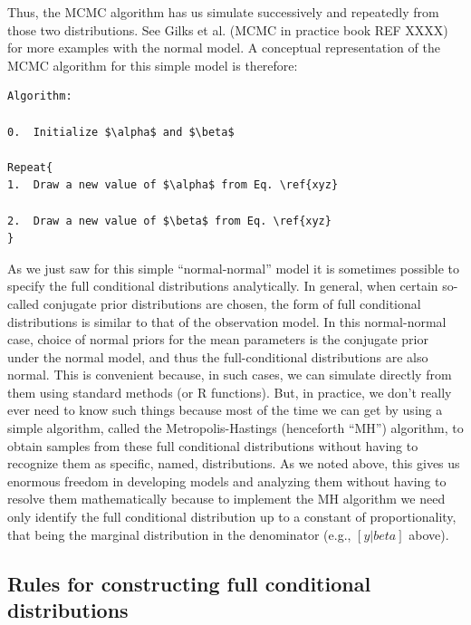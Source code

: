 Thus, the MCMC algorithm has us simulate successively and repeatedly from those two distributions. See Gilks et al. (MCMC in practice book REF XXXX) for more examples with the normal model. A conceptual representation of the MCMC algorithm for this simple model is therefore: 
\begin{verbatim}
Algorithm:

0.	Initialize $\alpha$ and $\beta$

Repeat{
1.	Draw a new value of $\alpha$ from Eq. \ref{xyz}

2.	Draw a new value of $\beta$ from Eq. \ref{xyz}
}
\end{verbatim}

As we just saw for this simple ``normal-normal'' model it is sometimes possible to specify the full conditional distributions analytically. In general, when certain so-called conjugate prior distributions are chosen, the form of full conditional distributions is similar to that of the observation model. In this normal-normal case, choice of normal priors for the mean parameters is the conjugate prior under the normal model, and thus the full-conditional distributions are also normal. This is convenient because, in such cases, we can simulate directly from them using standard methods (or R functions).  But, in practice,  we don't really ever need to know such things because most of the time we can get by using a simple algorithm, called the Metropolis-Hastings (henceforth ``MH'') algorithm, to obtain samples from these full conditional distributions without having to recognize them as specific, named, distributions. As we noted above, this gives us enormous freedom in developing models and analyzing them without having to resolve them mathematically because to implement the MH algorithm   we need only identify the full conditional distribution up to a constant of proportionality, that being the marginal distribution in the denominator (e.g., $[y|beta]$ above).


\subsection{Rules for constructing full conditional distributions}  

